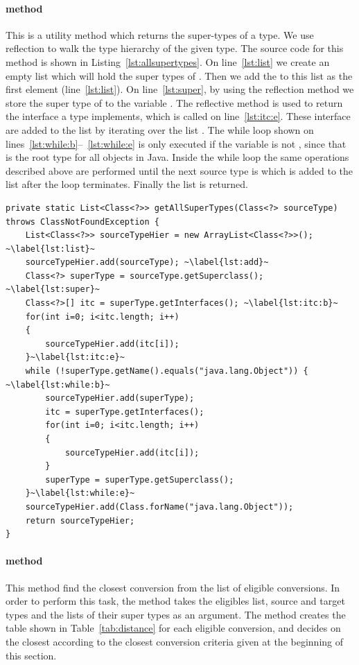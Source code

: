 \paragraph{ method} This is a utility method which returns the super-types of a type. We use reflection to walk the type hierarchy of the given type. The source code for this method is shown in Listing~\ref{lst:allsupertypes}.
On line~\ref{lst:list} we create an empty list which will hold the super types of .
Then we add the  to this list as the first element (line~\ref{lst:list}). 
On line~\ref{lst:super}, by using the reflection method  we store the super type of  to the variable . 
The reflective method  is used to return the interface a type implements, which is called on line~\ref{lst:itc:e}. These interface are added to the list  by iterating over the list .
The while loop shown on lines~\ref{lst:while:b}--~\ref{lst:while:e} is only executed if the variable  is not , since that is the root type for all objects in Java.
Inside the while loop the same operations described above are performed until the next source type is  which is added to the list after the loop terminates.
Finally the  list is returned. 

\begin{lstlisting}[float, caption={The source code for the \lstinln{getAllSuperTypes} method}, label={lst:allsupertypes}]
private static List<Class<?>> getAllSuperTypes(Class<?> sourceType) throws ClassNotFoundException {
	List<Class<?>> sourceTypeHier = new ArrayList<Class<?>>(); ~\label{lst:list}~
	sourceTypeHier.add(sourceType); ~\label{lst:add}~
	Class<?> superType = sourceType.getSuperclass(); ~\label{lst:super}~
	Class<?>[] itc = superType.getInterfaces(); ~\label{lst:itc:b}~
	for(int i=0; i<itc.length; i++)
	{
		sourceTypeHier.add(itc[i]);
	}~\label{lst:itc:e}~
	while (!superType.getName().equals("java.lang.Object")) { ~\label{lst:while:b}~
		sourceTypeHier.add(superType);
		itc = superType.getInterfaces();
		for(int i=0; i<itc.length; i++)
		{
			sourceTypeHier.add(itc[i]);
		}
		superType = superType.getSuperclass();
	}~\label{lst:while:e}~
	sourceTypeHier.add(Class.forName("java.lang.Object"));
	return sourceTypeHier;
}
\end{lstlisting}

\paragraph{ method} This method find the closest conversion from the list of eligible conversions. 
In order to perform this task, the method takes the eligibles list, source and target types and the lists of their super types as an argument. 
The method creates the table shown in Table~\ref{tab:distance} for each eligible conversion, and decides on the closest according to the closest conversion criteria given at the beginning of this section. 

